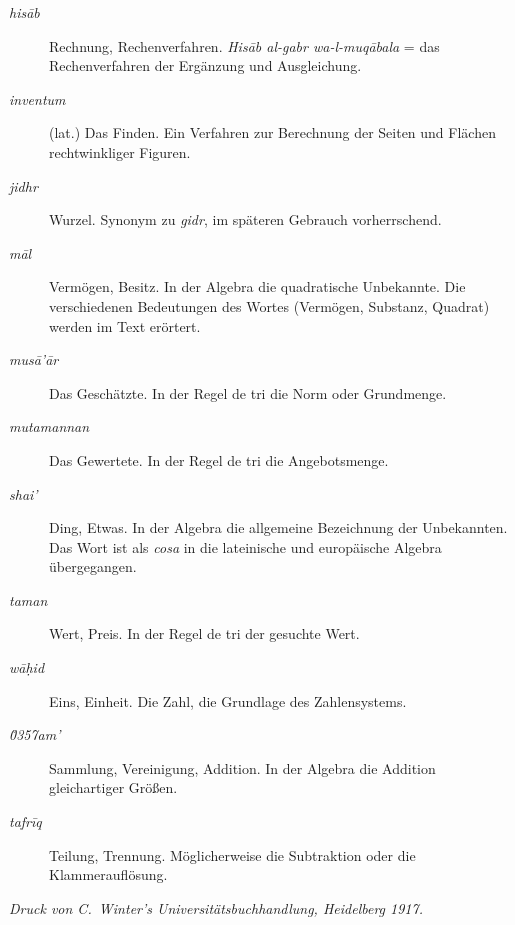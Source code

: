 \documentclass[11pt,a4paper]{article}
\begin{document}
\begin{description}
\item[\textit{his\=ab}] Rechnung, Rechenverfahren. \textit{His\=ab al-gabr wa-l-muq\=abala} = das Rechenverfahren der Erg\"anzung und Ausgleichung.
\item[\textit{inventum}] (lat.) Das Finden. Ein Verfahren zur Berechnung der Seiten und Fl\"achen rechtwinkliger Figuren.
\item[\textit{jidhr}] Wurzel. Synonym zu \textit{gidr}, im sp\"ateren Gebrauch vorherrschend.
\item[\textit{m\=al}] Verm\"ogen, Besitz. In der Algebra die quadratische Unbekannte. Die verschiedenen Bedeutungen des Wortes (Verm\"ogen, Substanz, Quadrat) werden im Text er\"ortert.
\item[\textit{mus\=a'\=ar}] Das Gesch\"atzte. In der Regel de tri die Norm oder Grundmenge.
\item[\textit{mutamannan}] Das Gewertete. In der Regel de tri die Angebotsmenge.
\item[\textit{shai'}] Ding, Etwas. In der Algebra die allgemeine Bezeichnung der Unbekannten. Das Wort ist als \textit{cosa} in die lateinische und europ\"aische Algebra \"ubergegangen.
\item[\textit{taman}] Wert, Preis. In der Regel de tri der gesuchte Wert.
\item[\textit{w\=a\d{h}id}] Eins, Einheit. Die Zahl, die Grundlage des Zahlensystems.
\item[\textit{\u0357{}am'}] Sammlung, Vereinigung, Addition. In der Algebra die Addition gleichartiger Gr\"o\ss{}en.
\item[\textit{tafr\={i}q}] Teilung, Trennung. M\"oglicherweise die Subtraktion oder die Klammeraufl\"osung.
\end{description}

\vspace{1cm}
\begin{center}
\textit{Druck von C.\ Winter's Universit\"atsbuchhandlung, Heidelberg 1917.}
\end{center}
\end{document}
